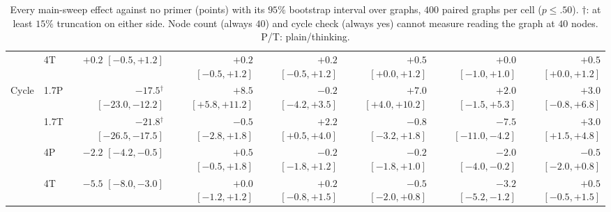 \documentclass[11pt]{article}
\begin{document}
\begin{table}[t]
{\begin{tabular}{llrrrrrr}
 & 4T & $+0.2$ {\tiny$[-0.5,+1.2]$} & $+0.2$ {\tiny$[-0.5,+1.2]$} & $+0.2$ {\tiny$[-0.5,+1.2]$} & $+0.5$ {\tiny$[+0.0,+1.2]$} & $+0.0$ {\tiny$[-1.0,+1.0]$} & $+0.5$ {\tiny$[+0.0,+1.2]$}\\ %
\addlinespace[1pt]
Cycle & 1.7P & $-17.5$$^\dagger$ {\tiny$[-23.0,-12.2]$} & $+8.5$ {\tiny$[+5.8,+11.2]$} & $-0.2$ {\tiny$[-4.2,+3.5]$} & $+7.0$ {\tiny$[+4.0,+10.2]$} & $+2.0$ {\tiny$[-1.5,+5.3]$} & $+3.0$ {\tiny$[-0.8,+6.8]$}\\ %
 & 1.7T & $-21.8$$^\dagger$ {\tiny$[-26.5,-17.5]$} & $-0.5$ {\tiny$[-2.8,+1.8]$} & $+2.2$ {\tiny$[+0.5,+4.0]$} & $-0.8$ {\tiny$[-3.2,+1.8]$} & $-7.5$ {\tiny$[-11.0,-4.2]$} & $+3.0$ {\tiny$[+1.5,+4.8]$}\\ %
 & 4P & $-2.2$ {\tiny$[-4.2,-0.5]$} & $+0.5$ {\tiny$[-0.5,+1.8]$} & $-0.2$ {\tiny$[-1.8,+1.2]$} & $-0.2$ {\tiny$[-1.8,+1.0]$} & $-2.0$ {\tiny$[-4.0,-0.2]$} & $-0.5$ {\tiny$[-2.0,+0.8]$}\\ %
 & 4T & $-5.5$ {\tiny$[-8.0,-3.0]$} & $+0.0$ {\tiny$[-1.2,+1.2]$} & $+0.2$ {\tiny$[-0.8,+1.5]$} & $-0.5$ {\tiny$[-2.0,+0.8]$} & $-3.2$ {\tiny$[-5.2,-1.2]$} & $+0.5$ {\tiny$[-0.5,+1.5]$}\\ %
\bottomrule
\end{tabular}}
\caption{Every main-sweep effect against no primer (points) with its $95\%$ bootstrap interval over graphs, $400$ paired graphs per cell ($p\leq.50$). $\dagger$: at least $15\%$ truncation on either side. Node count (always $40$) and cycle check (always yes) cannot measure reading the graph at $40$ nodes. P/T: plain/thinking.} %
\label{tab:full}
\end{table}
\end{document}
